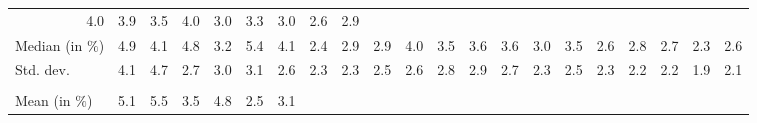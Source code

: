 \begin{tabular}{lllllllllllllllllllll}
  \multicolumn{1}{r}{4.0} &
  \multicolumn{1}{r}{3.9} &
  \multicolumn{1}{r}{3.5} &
  \multicolumn{1}{r}{4.0} &
  \multicolumn{1}{r}{3.0} &
  \multicolumn{1}{r}{3.3} &
  \multicolumn{1}{r}{3.0} &
  \multicolumn{1}{r}{2.6} &
  \multicolumn{1}{r}{2.9} \\
\multicolumn{1}{l}{\hspace{2em}Median (in $\%$)} &
  \multicolumn{1}{|r}{4.9} &
  \multicolumn{1}{r}{4.1} &
  \multicolumn{1}{r}{4.8} &
  \multicolumn{1}{r}{3.2} &
  \multicolumn{1}{r}{5.4} &
  \multicolumn{1}{r}{4.1} &
  \multicolumn{1}{r}{2.4} &
  \multicolumn{1}{r}{2.9} &
  \multicolumn{1}{r}{2.9} &
  \multicolumn{1}{r}{4.0} &
  \multicolumn{1}{r}{3.5} &
  \multicolumn{1}{r}{3.6} &
  \multicolumn{1}{r}{3.6} &
  \multicolumn{1}{r}{3.0} &
  \multicolumn{1}{r}{3.5} &
  \multicolumn{1}{r}{2.6} &
  \multicolumn{1}{r}{2.8} &
  \multicolumn{1}{r}{2.7} &
  \multicolumn{1}{r}{2.3} &
  \multicolumn{1}{r}{2.6} \\
\multicolumn{1}{l}{\hspace{2em}Std. dev.} &
  \multicolumn{1}{|r}{4.1} &
  \multicolumn{1}{r}{4.7} &
  \multicolumn{1}{r}{2.7} &
  \multicolumn{1}{r}{3.0} &
  \multicolumn{1}{r}{3.1} &
  \multicolumn{1}{r}{2.6} &
  \multicolumn{1}{r}{2.3} &
  \multicolumn{1}{r}{2.3} &
  \multicolumn{1}{r}{2.5} &
  \multicolumn{1}{r}{2.6} &
  \multicolumn{1}{r}{2.8} &
  \multicolumn{1}{r}{2.9} &
  \multicolumn{1}{r}{2.7} &
  \multicolumn{1}{r}{2.3} &
  \multicolumn{1}{r}{2.5} &
  \multicolumn{1}{r}{2.3} &
  \multicolumn{1}{r}{2.2} &
  \multicolumn{1}{r}{2.2} &
  \multicolumn{1}{r}{1.9} &
  \multicolumn{1}{r}{2.1} \\
\multicolumn{1}{l}{\hspace{1em}{\textit{Additive term} ($\widehat{t}/\widetilde{p}$)}} &
  \multicolumn{1}{|r}{} &
  \multicolumn{1}{r}{} &
  \multicolumn{1}{r}{} &
  \multicolumn{1}{r}{} &
  \multicolumn{1}{r}{} &
  \multicolumn{1}{r}{} &
  \multicolumn{1}{r}{} &
  \multicolumn{1}{r}{} &
  \multicolumn{1}{r}{} &
  \multicolumn{1}{r}{} &
  \multicolumn{1}{r}{} &
  \multicolumn{1}{r}{} &
  \multicolumn{1}{r}{} &
  \multicolumn{1}{r}{} &
  \multicolumn{1}{r}{} &
  \multicolumn{1}{r}{} &
  \multicolumn{1}{r}{} &
  \multicolumn{1}{r}{} &
  \multicolumn{1}{r}{} &
  \multicolumn{1}{r}{} \\
\multicolumn{1}{l}{\hspace{2em}Mean (in $\%$)} &
  \multicolumn{1}{|r}{5.1} &
  \multicolumn{1}{r}{5.5} &
  \multicolumn{1}{r}{3.5} &
  \multicolumn{1}{r}{4.8} &
  \multicolumn{1}{r}{2.5} &
  \multicolumn{1}{r}{3.1} &

\end{tabular}
